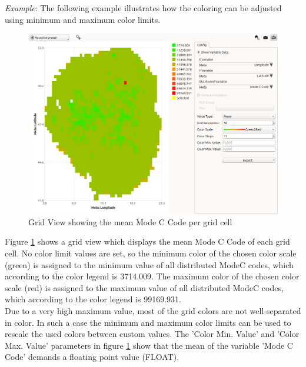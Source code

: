\textit{Example}: The following example illustrates how the coloring can be adjusted using minimum and maximum color limits. \\

\begin{figure}[H]
    \hspace*{-2cm}
    \includegraphics[width=18cm,frame]{figures/grid_modec_mean_nolimits.png}
  \caption{Grid View showing the mean Mode C Code per grid cell}
  \label{fig:grid_view_color_example1}
\end{figure}

Figure \ref{fig:grid_view_color_example1} shows a grid view which displays the mean Mode C Code of each grid cell.
No color limit values are set, so the minimum color of the chosen color scale (green) is assigned to the minimum 
value of all distributed ModeC codes, which according to the color legend is 3714.009. 
The maximum color of the chosen color scale (red) is assigned to the maximum 
value of all distributed ModeC codes, which according to the color legend is 99169.931. \\

Due to a very high maximum value, most of the grid colors are not well-separated in color.
In such a case the minimum and maximum color limits can be used to rescale the used colors
between custom values. The 'Color Min. Value' and 'Color Max. Value' parameters in figure \ref{fig:grid_view_color_example1}
show that the mean of the variable 'Mode C Code' demands a floating point value (FLOAT). 

